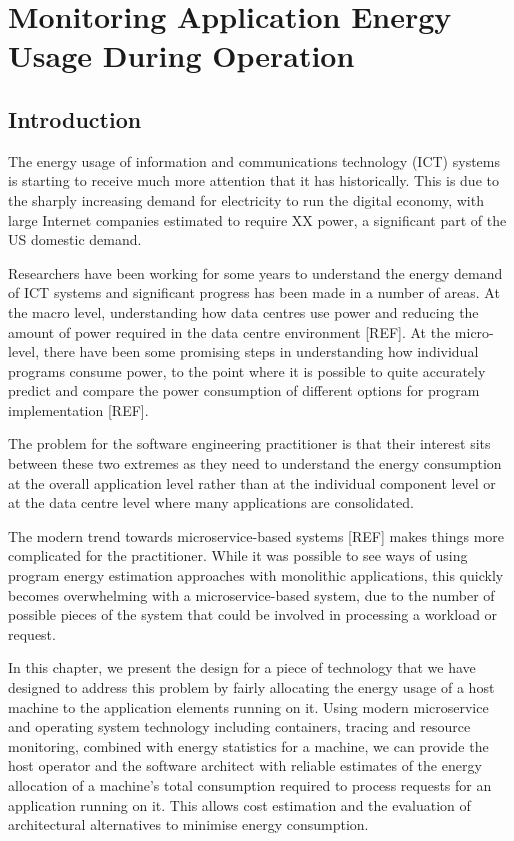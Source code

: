 \chapter{Monitoring Application Energy Usage During Operation}



\section{Introduction}

The energy usage of information and communications technology (ICT) systems is starting to receive much more attention that it has historically.  This is due to the sharply increasing demand for electricity to run the digital economy, with large Internet companies estimated to require XX power, a significant part of the US domestic demand.

Researchers have been working for some years to understand the energy demand of ICT systems and significant progress has been made in a number of areas.  At the macro level, understanding how data centres use power and reducing the amount of power required in the data centre environment [REF].  At the micro-level, there have been some promising steps in understanding how individual programs consume power, to the point where it is possible to quite accurately predict and compare the power consumption of different options for program implementation [REF].

The problem for the software engineering practitioner is that their interest sits between these two extremes as they need to understand the energy consumption at the overall application level rather than at the individual component level or at the data centre level where many applications are consolidated.

The modern trend towards microservice-based systems [REF] makes things more complicated for the practitioner.  While it was possible to see ways of using program energy estimation approaches with monolithic applications, this quickly becomes overwhelming with a microservice-based system, due to the number of possible pieces of the system that could be involved in processing a workload or request.

In this chapter, we present the design for a piece of technology that we have designed to address this problem by fairly allocating the energy usage of a host machine to the application elements running on it.  Using modern microservice and operating system technology including containers, tracing and resource monitoring, combined with energy statistics for a machine, we can provide the host operator and the software architect with reliable estimates of the energy allocation of a machine's total consumption required to process requests for an application running on it.  This allows cost estimation and the evaluation of architectural alternatives to minimise energy consumption.


